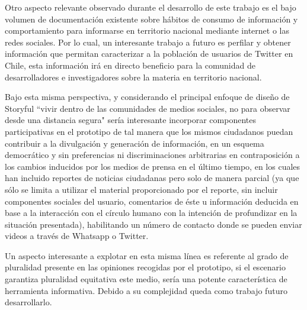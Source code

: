 Otro aspecto relevante observado durante el desarrollo de este trabajo es el bajo volumen de documentación existente sobre hábitos de consumo de información y comportamiento para informarse en territorio nacional mediante internet o las redes sociales. Por lo cual, un interesante trabajo a futuro es perfilar y obtener información que permitan caracterizar a la población de usuarios de Twitter en Chile, esta información irá en directo beneficio para la comunidad de desarrolladores e investigadores sobre la materia en territorio nacional. 

Bajo esta misma perspectiva, y considerando el principal enfoque de diseño de Storyful “vivir dentro de las comunidades de medios sociales, no para observar desde una distancia segura" sería interesante incorporar componentes participativas en el prototipo  de tal manera que los mismos ciudadanos puedan contribuir a la divulgación y generación de información, en un esquema democrático y sin preferencias ni discriminaciones arbitrarias en contraposición a los cambios inducidos  por los medios de prensa en el último tiempo, en los cuales han incluido reportes de noticias ciudadanas pero solo de manera parcial (ya que sólo se limita a utilizar el material proporcionado por el reporte, sin incluir componentes sociales del usuario, comentarios de éste u información deducida en base a la interacción con el círculo humano con la intención de profundizar en la situación presentada), habilitando un número de contacto donde se pueden enviar videos a través de Whatsapp o Twitter.

Un aspecto interesante a explotar en esta misma línea es referente al grado de pluralidad presente en las opiniones recogidas por el prototipo, si el escenario garantiza pluralidad equitativa este medio, sería una potente característica de herramienta informativa. Debido a su complejidad queda como trabajo futuro desarrollarlo.

	
	

	
